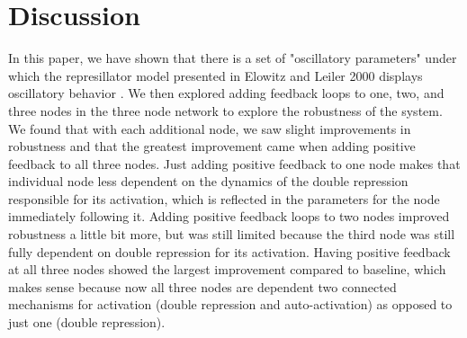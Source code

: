 \documentclass{article}
\begin{document}
\section{Discussion}

In this paper, we have shown that there is a set of "oscillatory parameters" under which the represillator model presented in Elowitz and Leiler 2000 displays oscillatory behavior \cite{represillator}. We then explored adding feedback loops to one, two, and three nodes in the three node network to explore the robustness of the system. We found that with each additional node, we saw slight improvements in robustness and that the greatest improvement came when adding positive feedback to all three nodes. Just adding positive feedback to one node makes that individual node less dependent on the dynamics of the double repression responsible for its activation, which is reflected in the parameters for the node immediately following it. Adding positive feedback loops to two nodes improved robustness a little bit more, but was still limited because the third node was still fully dependent on double repression for its activation. Having positive feedback at all three nodes showed the largest improvement compared to baseline, which makes sense because now all three nodes are dependent two connected mechanisms for activation (double repression and auto-activation) as opposed to just one (double repression).  
\end{document}
